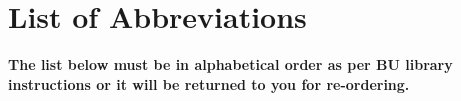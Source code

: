 \tableofcontents
\cleardoublepage



\chapter*{List of Abbreviations}

{\bf The list below must be in alphabetical order as per BU library instructions or it will be returned to you for re-ordering.}

\cleardoublepage

\newpage
\endofprelim
